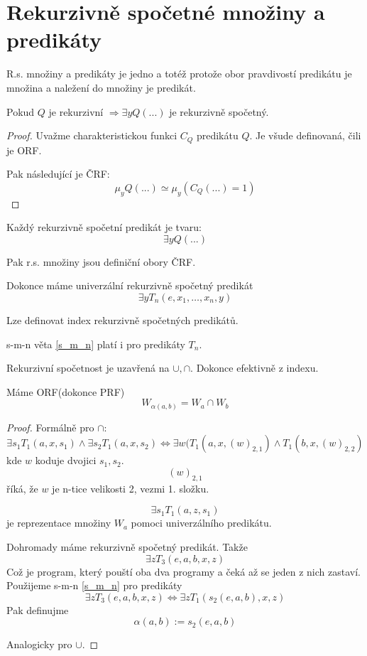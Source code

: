 \section{\texorpdfstring{Rekurzivně spočetné množiny a predikáty}{Rekurzivně spočetné množiny a predikáty}}
\vspace{5mm}
\large

\begin{note}
	R.s. množiny a predikáty je jedno a totéž protože obor pravdivostí predikátu je množina a naležení do množiny je predikát.
\end{note}

\begin{lemma}
	Pokud $Q$ je rekurzivní $\Rightarrow \exists y Q(...)$ je rekurzivně spočetný.
\end{lemma}
\begin{proof}
	Uvažme charakteristickou funkci $C_Q$ predikátu $Q$.
	Je všude definovaná, čili je ORF.

	Pak následující je ČRF:
	\[ \mu_y Q(...) \simeq \mu_y (C_Q(...) = 1) \]
\end{proof}

\begin{theorem}\label{univ_predic}
	Každý rekurzivně spočetní predikát je tvaru:
	\[ \exists y Q(...) \]

	Pak r.s. množiny jsou definiční obory ČRF.

	Dokonce máme univerzální rekurzivně spočetný predikát
	\[ \exists y T_n(e, x_1, \ldots, x_n, y) \]
\end{theorem}

\begin{consequence}
	Lze definovat index rekurzivně spočetných predikátů.
\end{consequence}

\begin{note}
	s-m-n věta \cref{s_m_n} platí i pro predikáty $T_n$.
\end{note}

\begin{theorem}
	Rekurzivní spočetnost je uzavřená na $\cup, \cap$.
	Dokonce efektivně z indexu.

	Máme ORF(dokonce PRF)
	\[ W_{\alpha(a, b)} = W_a \cap W_b \]
\end{theorem}
\begin{proof}
	Formálně pro $\cap$:
	\[ \exists s_1 T_1(a, x, s_1) \land \exists s_2 T_1(a, x, s_2) \iff \exists w(T_1(a, x, (w)_{2,1}) \land T_1(b, x, (w)_{2,2}) \]
	kde $w$ koduje dvojici $s_1, s_2$.
	\[ (w)_{2,1} \]
	říká, že $w$ je n-tice velikosti 2, vezmi 1. složku.

	\[ \exists s_1 T_1(a, z, s_1) \]
	je reprezentace množiny $W_a$ pomoci univerzálního predikátu.

	Dohromady máme rekurzivně spočetný predikát. Takže
	\[ \exists z T_3(e, a, b, x, z) \]
	Což je program, který pouští oba dva programy a čeká až se jeden z nich zastaví.
	Použijeme s-m-n \cref{s_m_n} pro predikáty
	\[ \exists z T_3(e, a, b, x, z) \iff \exists z T_1(s_2(e, a, b), x , z) \]
	Pak definujme
	\[ \alpha(a, b) := s_2(e, a, b) \]

	Analogicky pro $\cup$.
\end{proof}

